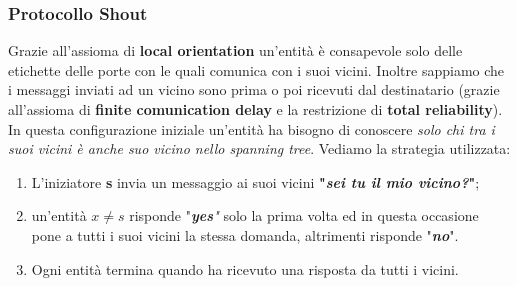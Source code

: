 \documentclass[12pt]{article}
\begin{document}
		\subsubsection{Protocollo Shout}
			Grazie all'assioma di \textbf{local orientation} un'entità è consapevole solo delle etichette delle porte con le quali comunica con i suoi vicini. Inoltre sappiamo che i messaggi inviati ad un vicino sono prima o poi ricevuti dal destinatario (grazie all'assioma di \textbf{finite comunication delay} e la restrizione di \textbf{total reliability}). In questa configurazione iniziale un'entità ha bisogno di conoscere \textit{solo chi tra i suoi vicini è anche suo vicino nello spanning tree}. Vediamo la strategia utilizzata:
			\begin{enumerate}
				\item L'iniziatore \textbf{s} invia un messaggio ai suoi vicini \textbf{"\textit{sei tu il mio vicino?}"};
				\item un'entità $x\neq s$ risponde "\textit{\textbf{yes}"} solo la prima volta ed in questa occasione pone a tutti i suoi vicini la stessa domanda, altrimenti risponde "\textbf{\textit{no}}".
				\item Ogni entità termina quando ha ricevuto una risposta da tutti i vicini. 
			\end{enumerate}
\end{document}
